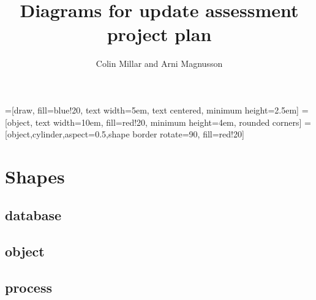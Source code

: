 \documentclass{article}
\begin{document}
\title{Diagrams for update assessment project plan}
\author{Colin Millar and Arni Magnusson}
\maketitle



=[draw, fill=blue!20, text width=5em, text centered, minimum height=2.5em]
 = [object, text width=10em, fill=red!20,  minimum height=4em, rounded corners]
 = [object,cylinder,aspect=0.5,shape border rotate=90, fill=red!20]






\section{Shapes}

\subsection{database}


\subsection{object}


\subsection{process}

\end{document}
